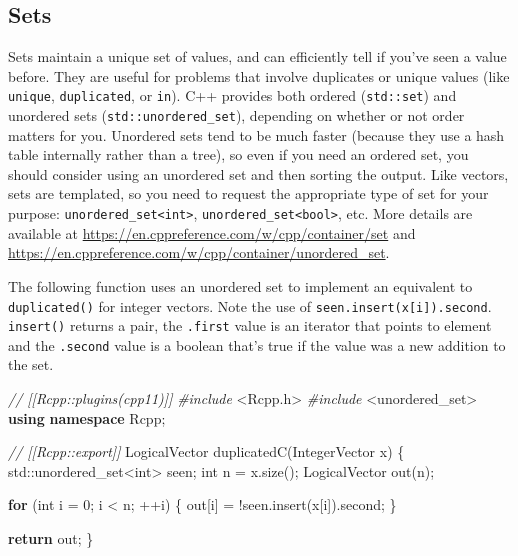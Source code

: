 \documentclass[]{book}
\newenvironment{Shaded}{\begin{snugshade}}{\end{snugshade}}
\newcommand{\BuiltInTok}[1]{#1}
\newcommand{\CommentTok}[1]{\textcolor[rgb]{0.37,0.37,0.37}{\textit{#1}}}
\newcommand{\ControlFlowTok}[1]{\textcolor[rgb]{0.27,0.27,0.27}{\textbf{#1}}}
\newcommand{\DataTypeTok}[1]{\textcolor[rgb]{0.27,0.27,0.27}{#1}}
\newcommand{\DecValTok}[1]{\textcolor[rgb]{0.06,0.06,0.06}{#1}}
\newcommand{\ImportTok}[1]{#1}
\newcommand{\KeywordTok}[1]{\textcolor[rgb]{0.27,0.27,0.27}{\textbf{#1}}}
\newcommand{\NormalTok}[1]{#1}
\newcommand{\PreprocessorTok}[1]{\textcolor[rgb]{0.37,0.37,0.37}{\textit{#1}}}
\begin{document}
\hypertarget{sets}{%
\subsection{Sets}\label{sets}}

Sets maintain a unique set of values, and can efficiently tell if you've seen a value before. They are useful for problems that involve duplicates or unique values (like \texttt{unique}, \texttt{duplicated}, or \texttt{in}). C++ provides both ordered (\texttt{std::set}) and unordered sets (\texttt{std::unordered\_set}), depending on whether or not order matters for you. Unordered sets tend to be much faster (because they use a hash table internally rather than a tree), so even if you need an ordered set, you should consider using an unordered set and then sorting the output. Like vectors, sets are templated, so you need to request the appropriate type of set for your purpose: \texttt{unordered\_set\textless{}int\textgreater{}}, \texttt{unordered\_set\textless{}bool\textgreater{}}, etc. More details are available at \url{https://en.cppreference.com/w/cpp/container/set} and \url{https://en.cppreference.com/w/cpp/container/unordered_set}. 

The following function uses an unordered set to implement an equivalent to \texttt{duplicated()} for integer vectors. Note the use of \texttt{seen.insert(x{[}i{]}).second}. \texttt{insert()} returns a pair, the \texttt{.first} value is an iterator that points to element and the \texttt{.second} value is a boolean that's true if the value was a new addition to the set.

\begin{Shaded}
\begin{Highlighting}[]
\CommentTok{// [[Rcpp::plugins(cpp11)]]}
\PreprocessorTok{#include }\ImportTok{<Rcpp.h>}
\PreprocessorTok{#include }\ImportTok{<unordered_set>}
\KeywordTok{using} \KeywordTok{namespace}\NormalTok{ Rcpp;}

\CommentTok{// [[Rcpp::export]]}
\NormalTok{LogicalVector duplicatedC(IntegerVector x) \{}
  \BuiltInTok{std::}\NormalTok{unordered_set<}\DataTypeTok{int}\NormalTok{> seen;}
  \DataTypeTok{int}\NormalTok{ n = x.size();}
\NormalTok{  LogicalVector out(n);}

  \ControlFlowTok{for}\NormalTok{ (}\DataTypeTok{int}\NormalTok{ i = }\DecValTok{0}\NormalTok{; i < n; ++i) \{}
\NormalTok{    out[i] = !seen.insert(x[i]).second;}
\NormalTok{  \}}

  \ControlFlowTok{return}\NormalTok{ out;}
\NormalTok{\}}
\end{Highlighting}
\end{Shaded}
\end{document}
